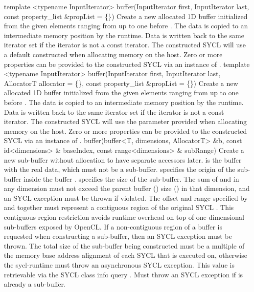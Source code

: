   \addRowThreeSL
    { template <typename InputIterator> }
    { buffer(InputIterator first, InputIterator last, }
    { const property_list \&propList = \{\}) }
    {
      Create a new allocated 1D buffer initialized from the given elements
      ranging from  up to one before .
      The data is copied to an intermediate memory position by the runtime.
      Data is written back to the same iterator set if the iterator is not
      a const iterator.
      The constructed SYCL  will use a default constructed  when allocating memory on the host.
      Zero or more properties can be provided to the constructed SYCL  via an instance of .
    }
  \addRowFourSL
    { template <typename InputIterator> }
    { buffer(InputIterator first, InputIterator last, }
    { AllocatorT allocator = \{\}, }
    { const property_list \&propList = \{\}) }
    {
      Create a new allocated 1D buffer initialized from the given elements
      ranging from  up to one before .
      The data is copied to an intermediate memory position by the runtime.
      Data is written back to the same iterator set if the iterator is not
      a const iterator.
      The constructed SYCL  will use the  parameter provided when allocating memory on the host.
      Zero or more properties can be provided to the constructed SYCL  via an instance of .
    }
  \addRowThreeSL
    { buffer(buffer<T, dimensions, AllocatorT> \&b, }
    { const id<dimensions> \& baseIndex, }
    { const range<dimensions> \& subRange) }
    {
      Create a new sub-buffer without allocation to have separate
      accessors later.  is the buffer with the real data, which must not be a sub-buffer.
       specifies the origin of the sub-buffer inside the
      buffer .  specifies the size of the sub-buffer.
      The sum of  and  in any dimension must not
      exceed the parent buffer () size () in that dimension,
      and an  SYCL exception must be thrown if violated.
      The offset and range specified by  and  together must represent a contiguous region of the original SYCL .  This contiguous region restriction avoids runtime overhead on top of one-dimensional sub-buffers exposed by OpenCL.  If a non-contiguous region of a buffer is requested when constructing a sub-buffer, then an  SYCL exception must be thrown.
      The total size of the sub-buffer being constructed must be a multiple of the memory base address alignment of each SYCL  that is executed on, otherwise the \gls{sycl-runtime} must throw an asynchronous  SYCL exception.
      This value is retrievable via the SYCL  class info query .
      Must throw an  SYCL exception if  is already a sub-buffer.
    }
